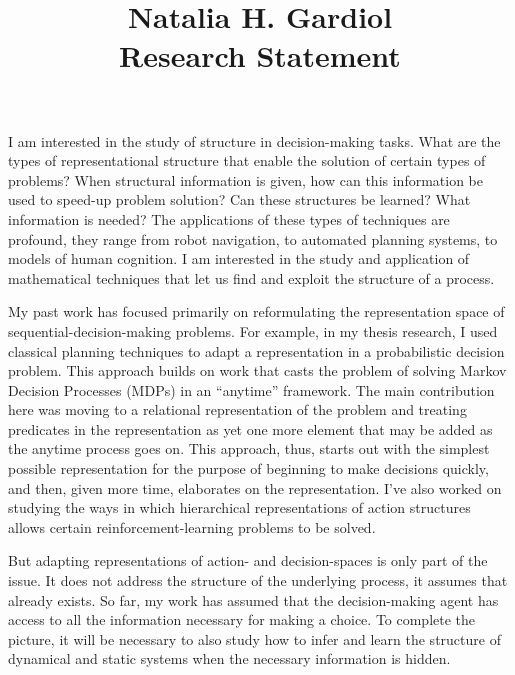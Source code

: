 \documentclass[12pt]{article}
\begin{document}
  
\title{{{\large{Natalia H. Gardiol \\ Research Statement}}}}

\maketitle

I am interested in the study of structure in decision-making tasks. What are the types of representational structure that enable the solution of certain types of problems? When structural information is given, how can this information be used to speed-up problem solution? Can these structures be learned? What information is needed?
The applications of these types of techniques are profound, they range from robot navigation, to automated planning systems, to models of human cognition.  
I am interested in the study and application of mathematical
techniques that let us find and exploit the structure of a process.



My past work has focused primarily on reformulating the representation space of
sequential-decision-making problems. For example, in my thesis
research, I used classical planning techniques to adapt a
representation in a probabilistic decision problem. This approach builds on work that casts the problem of solving Markov Decision Processes (MDPs) in an ``anytime'' framework. The main contribution here was moving to a relational representation of the problem and treating predicates in the representation as yet one more element that may be added as the anytime process goes on. This approach, thus, starts out with the simplest possible representation for the purpose of beginning to make decisions quickly, and then, given more time, elaborates on the representation.
I've also worked
on studying the ways in which hierarchical representations of action
structures allows certain reinforcement-learning problems to be solved.

But adapting representations of action- and decision-spaces is only part of the
issue. It does not address the structure of the underlying process,
it assumes that already exists. So far, my work has assumed that the decision-making agent has access to all the information necessary for making a choice. 
To complete the picture, it will be
necessary to also study how to infer and learn the structure of
dynamical and static systems when the necessary information is hidden.


\end{document}
